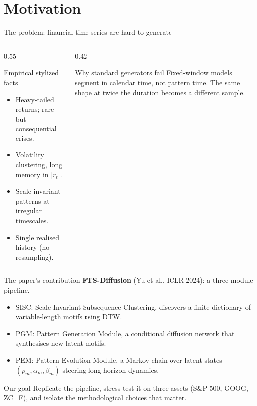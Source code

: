 \section{Motivation}

\begin{frame}{The problem: financial time series are hard to generate}
\begin{columns}[T,onlytextwidth]
\begin{column}{0.55\textwidth}
\begin{block}{Empirical stylized facts}
\begin{itemize}\setlength\itemsep{2pt}
  \item Heavy-tailed returns; rare but consequential crises.
  \item Volatility clustering, long memory in $|r_t|$.
  \item Scale-invariant patterns at irregular timescales.
  \item Single realised history (no resampling).
\end{itemize}
\end{block}
\end{column}
\begin{column}{0.42\textwidth}
\begin{alertblock}{Why standard generators fail}
Fixed-window models segment in \alert{calendar time}, not \alert{pattern time}.
The same shape at twice the duration becomes a different sample.
\end{alertblock}
\end{column}
\end{columns}
\end{frame}

\begin{frame}{The paper's contribution}
\textbf{FTS-Diffusion} (Yu et al., ICLR 2024): a three-module pipeline.
\medskip
\begin{itemize}\setlength\itemsep{2pt}
  \item \alert{SISC}: Scale-Invariant Subsequence Clustering, discovers a finite dictionary of variable-length motifs using DTW.
  \item \alert{PGM}: Pattern Generation Module, a conditional diffusion network that synthesises new latent motifs.
  \item \alert{PEM}: Pattern Evolution Module, a Markov chain over latent states $(p_m,\alpha_m,\beta_m)$ steering long-horizon dynamics.
\end{itemize}
\medskip
\begin{exampleblock}{Our goal}
Replicate the pipeline, stress-test it on three assets (S\&P 500, GOOG, ZC=F), and isolate the methodological choices that matter.
\end{exampleblock}
\end{frame}
